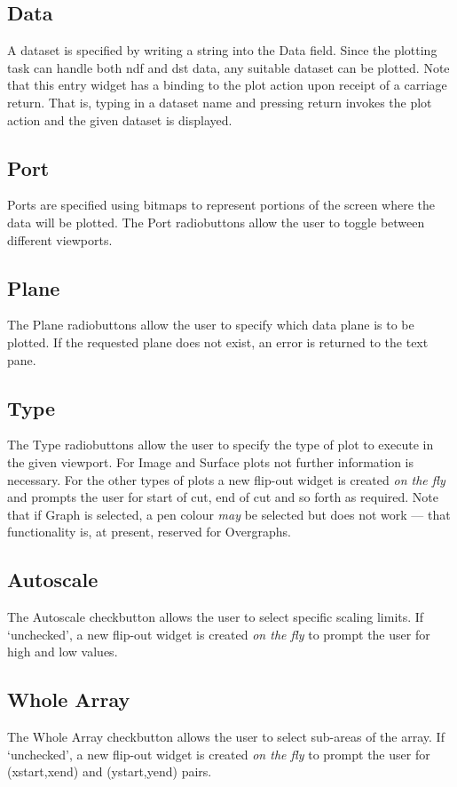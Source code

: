 \documentclass[a4paper]{book}
\renewcommand{\_}{{\tt\char'137}}
\begin{document}
\subsection{Data}
A dataset is specified by writing a string into the {\sf Data} field. Since
the plotting task can handle both {\sc ndf} and {\sc dst} data, any suitable
dataset can be plotted. Note that this entry widget has a binding to the plot
action upon receipt of a carriage return. That is, typing in a dataset name
and pressing {\sc return} invokes the plot action and the given dataset is
displayed.

\subsection{Port}
Ports are specified using bitmaps to represent portions of the screen
where the data will be plotted.
The {\sf Port} radiobuttons allow the user to toggle between different viewports.

\subsection{Plane}
The {\sf Plane} radiobuttons allow the user to specify which data plane is to be
plotted. If the requested plane does not exist, an error is returned to the text pane.

\subsection{Type}
The {\sf Type} radiobuttons allow the user to specify the type of plot to execute
in the given viewport. For {\sf Image} and {\sf Surface} plots not further information
is necessary. For the other types of plots a new flip-out widget is created {\em on the
fly} and prompts the user for start of cut, end of cut and so forth as required. Note that if
{\sf Graph} is selected, a pen colour {\em may} be selected but does not work --- that
functionality is, at present, reserved for {\sf Overgraphs}.

\subsection{Autoscale}
The {\sf Autoscale} checkbutton allows the user to select specific scaling limits.
If `unchecked', a new flip-out widget is created {\em on the fly} to prompt the user for
high and low values.

\subsection{Whole Array}
The {\sf Whole Array} checkbutton allows the user to select sub-areas of the array.
If `unchecked', a new flip-out widget is created {\em on the fly} to prompt the user for
(xstart,xend) and (ystart,yend) pairs.
\end{document}
